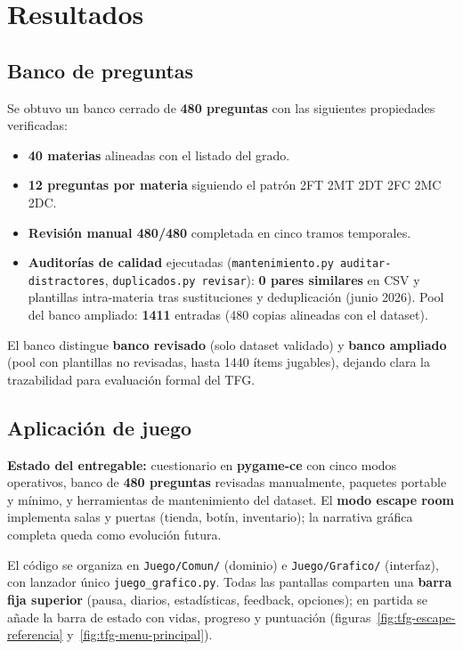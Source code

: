 \documentclass[11pt,a4paper]{article}
\begin{document}
\section{Resultados}

\subsection{Banco de preguntas}

Se obtuvo un banco cerrado de \textbf{480 preguntas} con las siguientes propiedades verificadas:
\begin{itemize}
  \item \textbf{40 materias} alineadas con el listado del grado.
  \item \textbf{12 preguntas por materia} siguiendo el patrón 2FT 2MT 2DT 2FC 2MC 2DC.
  \item \textbf{Revisión manual 480/480} completada en cinco tramos temporales.
  \item \textbf{Auditorías de calidad} ejecutadas (\texttt{mantenimiento.py auditar-distractores}, \texttt{duplicados.py revisar}): \textbf{0 pares similares} en CSV y plantillas intra-materia tras sustituciones y deduplicación (junio 2026). Pool del banco ampliado: \textbf{1411} entradas (480 copias alineadas con el dataset).
\end{itemize}

El banco distingue \textbf{banco revisado} (solo dataset validado) y \textbf{banco ampliado} (pool con plantillas no revisadas, hasta 1440 ítems jugables), dejando clara la trazabilidad para evaluación formal del TFG.

\subsection{Aplicación de juego}

\textbf{Estado del entregable:} cuestionario en \textbf{pygame-ce} con cinco modos operativos, banco de \textbf{480 preguntas} revisadas manualmente, paquetes portable y mínimo, y herramientas de mantenimiento del dataset. El \textbf{modo escape room} implementa salas y puertas (tienda, botín, inventario); la narrativa gráfica completa queda como evolución futura.

El código se organiza en \texttt{Juego/Comun/} (dominio) e \texttt{Juego/Grafico/} (interfaz), con lanzador único \texttt{juego\_grafico.py}. Todas las pantallas comparten una \textbf{barra fija superior} (pausa, diarios, estadísticas, feedback, opciones); en partida se añade la barra de estado con vidas, progreso y puntuación (figuras~\ref{fig:tfg-escape-referencia} y~\ref{fig:tfg-menu-principal}).
\end{document}
